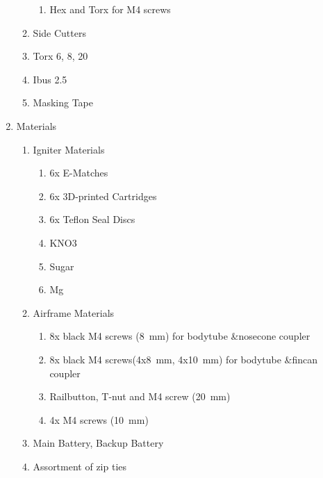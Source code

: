 \begin{enumerate}[label=R\arabic*.]
\begin{enumerate}[label*=\arabic*.]
\begin{enumerate}[label*=\arabic*.]
                \item Hex and Torx for M4 screws \leftcheckbox
            \end{enumerate}
            \item Side Cutters\leftcheckbox
            \item Torx 6, 8, 20\leftcheckbox
            \item Ibus 2.5\leftcheckbox
            \item Masking Tape\leftcheckbox
        \end{enumerate}
    \item \label{rocket_materials} Materials
        \begin{enumerate}[label*=\arabic*.]
            \item Igniter Materials\leftcheckbox
            \begin{enumerate}[label*=\arabic*.]
                \item 6x E-Matches \leftcheckbox
                \item 6x 3D-printed Cartridges \leftcheckbox
                \item 6x Teflon Seal Discs\leftcheckbox
                \item KNO3\leftcheckbox
                \item Sugar\leftcheckbox
                \item Mg\leftcheckbox
            \end{enumerate}
            \item Airframe Materials\leftcheckbox
            \begin{enumerate}[label*=\arabic*.]
                \item 8x black M4 screws (\SI{8}{\milli\meter}) for bodytube \&\newline nosecone coupler \leftcheckbox
                \item 8x black M4 screws(4x\SI{8}{\milli\meter}, 4x\SI{10}{\milli\meter}) for bodytube \&\newline fincan coupler \leftcheckbox
                \item Railbutton, T-nut and M4 screw (\SI{20}{\milli\meter}) \leftcheckbox
                \item 4x M4  screws (\SI{10}{\milli\meter}) \leftcheckbox
            \end{enumerate}
            \item Main Battery, Backup Battery\leftcheckbox
            \item Assortment of zip ties\leftcheckbox

\end{enumerate}
\end{enumerate}
